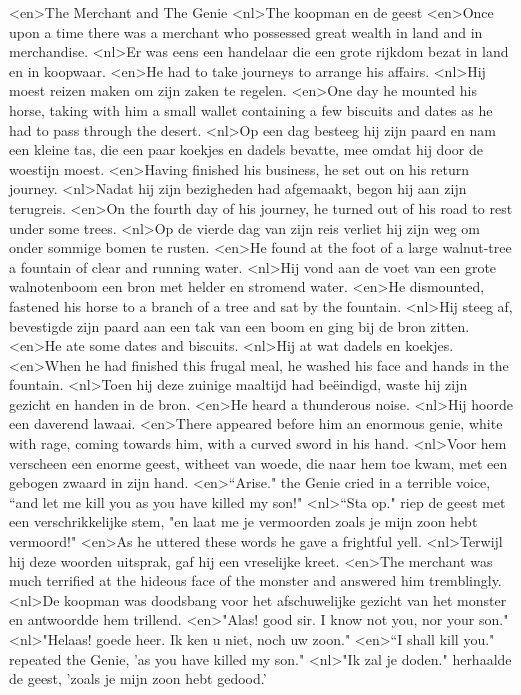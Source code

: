 <en>The Merchant and The Genie
<nl>The koopman en de geest
<en>Once upon a time there was a merchant who possessed great wealth in land and in merchandise.
<nl>Er was eens een handelaar die een grote rijkdom bezat in land en in koopwaar.
<en>He had to take journeys to arrange his affairs.
<nl>Hij moest reizen maken om zijn zaken te regelen.
<en>One day he mounted his horse, taking with him a small wallet containing a few biscuits and dates as he had to pass through the desert.
<nl>Op een dag besteeg hij zijn paard en nam een kleine tas, die  een paar koekjes en dadels bevatte, mee omdat hij door de woestijn moest.
<en>Having finished his business, he set out on his return journey.
<nl>Nadat hij zijn bezigheden had afgemaakt, begon  hij aan zijn terugreis.
<en>On the fourth day of his journey, he turned out of his road to rest under some trees.
<nl>Op de vierde dag van zijn reis verliet hij zijn weg om onder sommige bomen te rusten.
<en>He found at the foot of a large walnut-tree a fountain of clear and running water.
<nl>Hij vond aan de voet van een grote walnotenboom een bron met helder en stromend water.
<en>He dismounted, fastened his horse to a branch of a tree and sat by the fountain.
<nl>Hij steeg af, bevestigde zijn paard aan een tak van een boom en ging bij de bron zitten.
<en>He ate some dates and biscuits.
<nl>Hij at wat dadels en koekjes.
<en>When he had finished this frugal meal, he washed his face and hands in the fountain.
<nl>Toen hij deze zuinige maaltijd had beëindigd, waste hij zijn gezicht en handen in de bron.
<en>He heard a thunderous noise.
<nl>Hij hoorde een daverend lawaai.
<en>There appeared before him an enormous genie, white with rage, coming towards him, with a curved sword in his hand.
<nl>Voor hem verscheen een enorme geest, witheet van woede, die naar hem toe kwam, met een gebogen zwaard in zijn hand.
<en>“Arise." the Genie cried in a terrible voice, “and let me kill you as you have killed my son!"
<nl>“Sta op." riep de geest met een verschrikkelijke stem, "en laat me je vermoorden zoals je mijn zoon hebt vermoord!"
<en>As he uttered these words he gave a frightful yell.
<nl>Terwijl hij deze woorden uitsprak, gaf hij een vreselijke kreet.
<en>The merchant was much terrified at the hideous face of the monster and answered him tremblingly.
<nl>De koopman was doodsbang voor het afschuwelijke gezicht van het monster en antwoordde hem trillend.
<en>"Alas! good sir. I know not you, nor your son." 
<nl>"Helaas! goede heer. Ik ken u niet, noch uw zoon."
<en>“I shall kill you." repeated the Genie, 'as you have killed my son."
<nl>"Ik zal je doden." herhaalde de geest, 'zoals je mijn zoon hebt gedood.'

